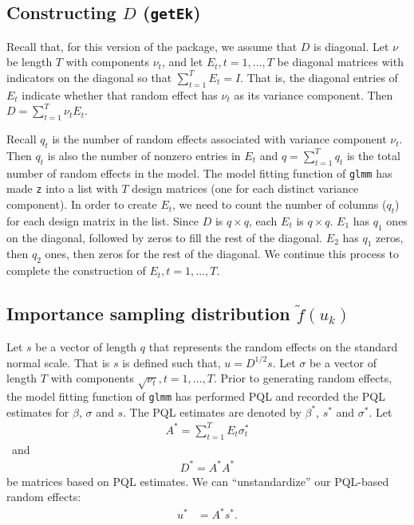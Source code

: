\documentclass{article}
\begin{document}
\subsection{Constructing $D$ (\texttt{getEk})}\label{sec:getEk}
Recall that, for this version of the package, we assume that $D$ is diagonal.  Let $\nu$ be length $T$ with components $\nu_t$, and let $E_t,t=1,\ldots,T$ be diagonal matrices with indicators on the diagonal so that $\sum_{t=1}^T E_t = I$. That is, the diagonal entries  of $E_t$ indicate whether that random effect has $\nu_t$ as its variance component. Then $D=\sum_{t=1}^T\nu_t  E_t $.  

Recall $q_t$ is the number of random effects associated with variance component $\nu_t$. Then $q_t$ is also the number of nonzero entries in $E_t$ and $q=\sum_{t=1}^T q_t$ is the total number of random effects in the model.  
The model fitting function of \texttt{glmm} has made  \texttt{z} into a list with $T$ design matrices (one for each distinct variance component).  In order to create $E_t$, we need to  count the  number of columns ($q_t$) for each design matrix in the list.
Since $D$  is $q \times q$, each $E_t$  is $q \times q$.   $E_1$ has $q_1$ ones on the diagonal, followed by zeros to fill the rest of the diagonal.  $E_2$ has $q_1$ zeros, then $q_2$ ones, then zeros for the rest of the diagonal. We continue this process to complete the construction of $E_t, t=1,\ldots, T$.

\subsection{Importance sampling distribution $\tilde{f}(u_k)$}\label{sec:ftwiddle}
 Let $s$ be a vector of length $q$ that represents the random effects on the standard normal scale. That is $s$ is defined such that, $u= D^{1/2}s$. Let $\sigma$ be a vector of length $T$ with components $\sqrt{\nu_t},t=1,\ldots,T$.  Prior to generating random effects, the model fitting function of \texttt{glmm} has performed PQL and recorded the PQL estimates for $\beta$, $\sigma$ and  $s$. The PQL estimates are denoted by $\beta^*$, $s^*$ and $\sigma^*$. Let
\begin{align}
A^*=\sum_{t=1}^T E_t \sigma^*_t
\end{align}\
and
\begin{align}
 D^* =A^*A^*
\end{align}
be matrices based on PQL estimates. We can ``unstandardize'' our PQL-based random effects:
\begin{align}
u^*&=A^*s^*.
\end{align}
\end{document}
